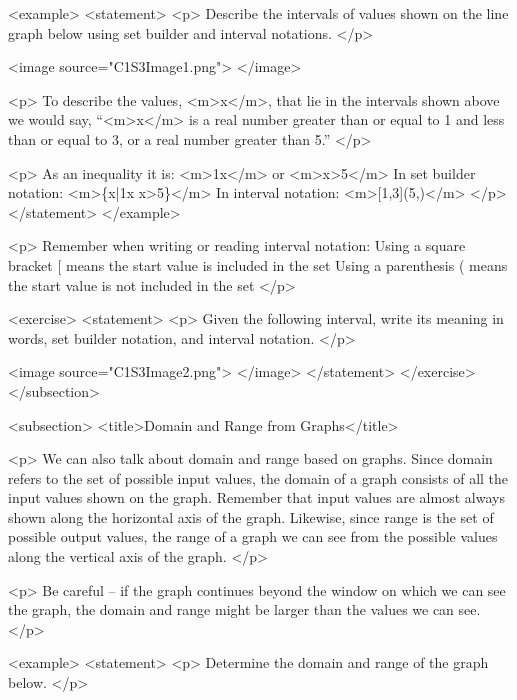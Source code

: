         <example>
            <statement>
                <p>
                    Describe the intervals of values shown on the line graph below using set builder and interval notations.
                </p>

                <image source="C1S3Image1.png">
                </image>

                <p>
                    To describe the values, <m>x</m>, that lie in the intervals shown above we would say, “<m>x</m> is a real number greater than or equal to 1 and less than or equal to 3, or a real number greater than 5.”
                </p>

                <p>
                    As an inequality it is: <m>1\leq x</m> or <m>x>5</m> In set builder notation: <m>\{x|1\leq x x>5\}</m> In interval notation: <m>[1,3]\cup(5,\infty)</m>
                </p>
            </statement>
        </example>

        <p>
            Remember when writing or reading interval notation: Using a square bracket [ means the start value is included in the set Using a parenthesis ( means the start value is not included in the set
        </p>

        <exercise>
            <statement>
                <p>
                    Given the following interval, write its meaning in words, set builder notation, and interval notation.
                </p>

                <image source="C1S3Image2.png">
                </image>
            </statement>
        </exercise>
    </subsection>


    <subsection>
        <title>Domain and Range from Graphs</title>

        <p>
            We can also talk about domain and range based on graphs.
            Since domain refers to the set of possible input values, the domain of a graph consists of all the input values shown on the graph.
            Remember that input values are almost always shown along the horizontal axis of the graph.
            Likewise, since range is the set of possible output values, the range of a graph we can see from the possible values along the vertical axis of the graph.
        </p>

        <p>
            Be careful – if the graph continues beyond the window on which we can see the graph, the domain and range might be larger than the values we can see.
        </p>

        <example>
            <statement>
                <p>
                    Determine the domain and range of the graph below.
                </p>

